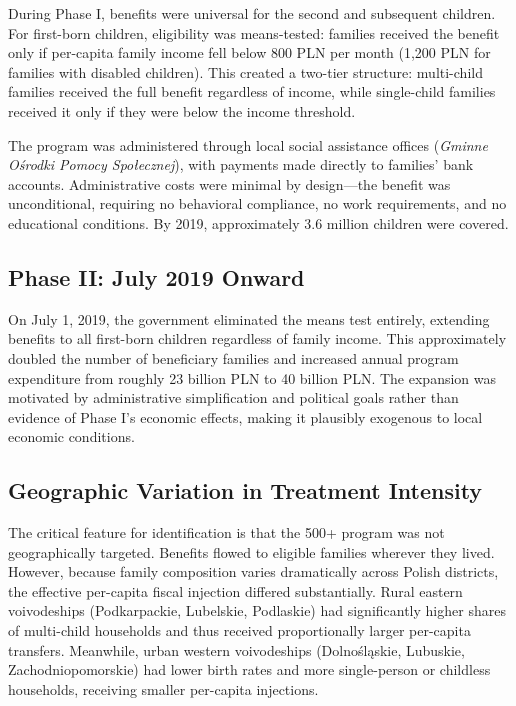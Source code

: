 \documentclass[12pt]{article}
\begin{document}
During Phase I, benefits were universal for the second and subsequent children. For first-born children, eligibility was means-tested: families received the benefit only if per-capita family income fell below 800 PLN per month (1,200 PLN for families with disabled children). This created a two-tier structure: multi-child families received the full benefit regardless of income, while single-child families received it only if they were below the income threshold.

The program was administered through local social assistance offices (\emph{Gminne O\'{s}rodki Pomocy Spo\l{}ecznej}), with payments made directly to families' bank accounts. Administrative costs were minimal by design---the benefit was unconditional, requiring no behavioral compliance, no work requirements, and no educational conditions. By 2019, approximately 3.6 million children were covered.

\subsection{Phase II: July 2019 Onward}

On July 1, 2019, the government eliminated the means test entirely, extending benefits to all first-born children regardless of family income. This approximately doubled the number of beneficiary families and increased annual program expenditure from roughly 23 billion PLN to 40 billion PLN. The expansion was motivated by administrative simplification and political goals rather than evidence of Phase I's economic effects, making it plausibly exogenous to local economic conditions.

\subsection{Geographic Variation in Treatment Intensity}

The critical feature for identification is that the 500+ program was not geographically targeted. Benefits flowed to eligible families wherever they lived. However, because family composition varies dramatically across Polish districts, the effective per-capita fiscal injection differed substantially. Rural eastern voivodeships (Podkarpackie, Lubelskie, Podlaskie) had significantly higher shares of multi-child households and thus received proportionally larger per-capita transfers. Meanwhile, urban western voivodeships (Dolno\'{s}l\k{a}skie, Lubuskie, Zachodniopomorskie) had lower birth rates and more single-person or childless households, receiving smaller per-capita injections.
\end{document}
